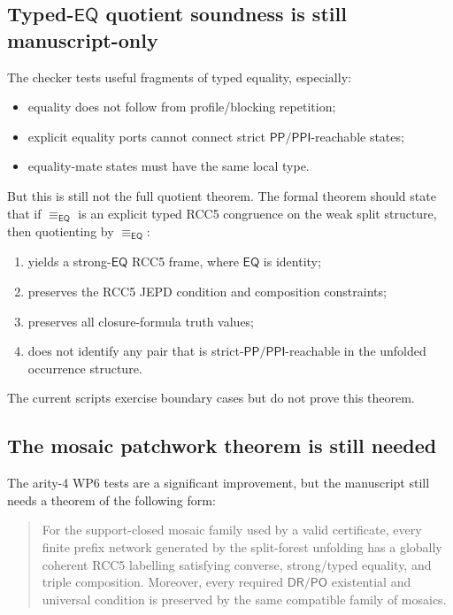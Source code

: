 \documentclass[11pt]{article}
\newcommand{\PP}{\mathsf{PP}}
\newcommand{\PPI}{\mathsf{PPI}}
\newcommand{\DR}{\mathsf{DR}}
\newcommand{\PO}{\mathsf{PO}}
\newcommand{\EQ}{\mathsf{EQ}}
\newcommand{\eqEQ}{\equiv_{\EQ}}
\begin{document}
\subsection{Typed-\texorpdfstring{\(\EQ\)}{EQ} quotient soundness is still manuscript-only}

The checker tests useful fragments of typed equality, especially:
\begin{itemize}[leftmargin=2em]
  \item equality does not follow from profile/blocking repetition;
  \item explicit equality ports cannot connect strict \(\PP/\PPI\)-reachable states;
  \item equality-mate states must have the same local type.
\end{itemize}
But this is still not the full quotient theorem.  The formal theorem should state that if \(\eqEQ\) is an explicit typed RCC5 congruence on the weak split structure, then quotienting by \(\eqEQ\):
\begin{enumerate}[label=(\alph*),leftmargin=2em]
  \item yields a strong-\(\EQ\) RCC5 frame, where \(\EQ\) is identity;
  \item preserves the RCC5 JEPD condition and composition constraints;
  \item preserves all closure-formula truth values;
  \item does not identify any pair that is strict-\(\PP/\PPI\)-reachable in the unfolded occurrence structure.
\end{enumerate}
The current scripts exercise boundary cases but do not prove this theorem.

\subsection{The mosaic patchwork theorem is still needed}

The arity-4 WP6 tests are a significant improvement, but the manuscript still needs a theorem of the following form:

\begin{quote}
For the support-closed mosaic family used by a valid certificate, every finite prefix network generated by the split-forest unfolding has a globally coherent RCC5 labelling satisfying converse, strong/typed equality, and triple composition.  Moreover, every required \(\DR/\PO\) existential and universal condition is preserved by the same compatible family of mosaics.
\end{quote}
\end{document}
